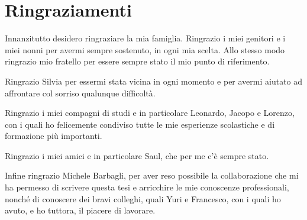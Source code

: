 \chapter*{Ringraziamenti}

Innanzitutto desidero ringraziare la mia famiglia. Ringrazio i miei genitori e i miei nonni per avermi sempre sostenuto, in ogni mia scelta. Allo stesso modo ringrazio mio fratello per essere sempre stato il mio punto di riferimento.\par
Ringrazio Silvia per essermi stata vicina in ogni momento e per avermi aiutato ad affrontare col sorriso qualunque difficolt\`a.\par
Ringrazio i miei compagni di studi e in particolare Leonardo, Jacopo e Lorenzo, con i quali ho felicemente condiviso tutte le mie esperienze scolastiche e di formazione pi\`u importanti.\par
Ringrazio i miei amici e in particolare Saul, che per me c'\`e sempre stato.\par
Infine ringrazio Michele Barbagli, per aver reso possibile la collaborazione che mi ha permesso di scrivere questa tesi e arricchire le mie conoscenze professionali, nonch\'e di conoscere dei bravi colleghi, quali Yuri e Francesco, con i quali ho avuto, e ho tuttora, il piacere di lavorare.
